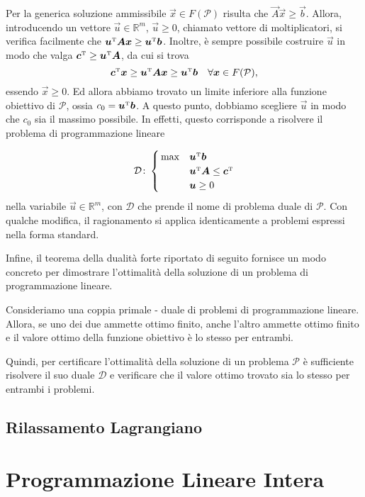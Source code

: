 Per la generica soluzione ammissibile $\vec{x} \in F(\mathcal{P})$ risulta
che $\vec{A}\vec{x} \ge \vec{b}$. Allora, introducendo un vettore $\vec{u}
\in \mathbb{R}^m$, $\vec{u} \ge 0$, chiamato vettore  di moltiplicatori, si
verifica facilmente che $\bm{u}^{\scriptscriptstyle\mathrm{T}} \bm{A} \bm{x} \ge \bm{u}^{\scriptscriptstyle\mathrm{T}}\bm{b}$.
Inoltre, è sempre possibile costruire $\vec{u}$ in modo che valga
$\bm{c}^{\scriptscriptstyle\mathrm{T}} \ge \bm{u}^{\scriptscriptstyle\mathrm{T}} \bm{A}$, da cui si trova
\begin{equation}\label{eq:weak_duality}
    \bm{c}^{\scriptscriptstyle\mathrm{T}} \bm{x} \ge \bm{u}^{\scriptscriptstyle\mathrm{T}} \bm{A} \bm{x} \ge \bm{u}^{\scriptscriptstyle\mathrm{T}}\bm{b}
    \quad \forall \bm{x} \in F(\mathcal{P}),
\end{equation}
essendo $\vec{x} \ge 0$. Ed allora abbiamo trovato un limite inferiore alla
funzione obiettivo di $\mathcal{P}$, ossia $c_{0} = \bm{u}^{\scriptscriptstyle\mathrm{T}} \bm{b}$. A
questo punto, dobbiamo scegliere $\vec{u}$ in modo che $c_{0}$ sia il
massimo possibile. In effetti, questo corrisponde a risolvere il problema
di programmazione lineare

\begin{equation}
    \mathcal{D}\colon
    \begin{cases}
        \,\max & \bm{u}^{\scriptscriptstyle\mathrm{T}} \bm{b} \\
               & \bm{u}^{\scriptscriptstyle\mathrm{T}}\bm{A} \le \bm{c}^{\scriptscriptstyle\mathrm{T}} \\
             & \bm{u} \ge 0
    \end{cases}\\[5pt]
\end{equation}
nella variabile $\vec{u} \in \mathbb{R}^m$, con $\mathcal{D}$ che prende il
nome di problema duale di $\mathcal{P}$. Con qualche modifica, il
ragionamento si applica identicamente a problemi espressi nella forma
standard.

Infine, il teorema della dualità forte riportato di seguito fornisce un
modo concreto per dimostrare l'ottimalità della soluzione di un problema
di programmazione lineare.
\begin{theorem}
    Consideriamo una coppia primale - duale di problemi di programmazione
    lineare. Allora, se uno dei due ammette ottimo finito, anche l'altro
    ammette ottimo finito e il valore ottimo della funzione obiettivo è lo
    stesso per entrambi.
\end{theorem}
Quindi, per certificare l'ottimalità della soluzione di un problema
$\mathcal{P}$ è sufficiente risolvere il suo duale $\mathcal{D}$ e
verificare che il valore ottimo trovato sia lo stesso per entrambi i
problemi.

\subsection{Rilassamento Lagrangiano}

\section{Programmazione Lineare Intera}

